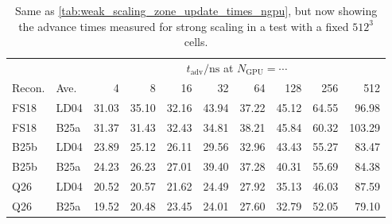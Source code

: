 \begin{table}
\centering
\caption{Same as \autoref{tab:weak_scaling_zone_update_times_ngpu}, but now showing the advance times measured for strong scaling in a test with a fixed $512^3$ cells.}
\label{tab:strong_scaling_zone_update_times_ngpu}
\begin{tabular}{llrrrrrrrr}
\hline\hline
& & \multicolumn{8}{c}{$t_\mathrm{adv}/\mathrm{ns}$ at $N_\mathrm{GPU}=\cdots$} \\
Recon. & Ave. &
4 & 8 & 16 & 32 & 64 & 128 & 256 & 512 \\
\hline
FS18 & LD04
& 31.03 & 35.10 & 32.16 & 43.94 & 37.22 & 45.12 & 64.55 & 96.98 \\
FS18 & B25a
& 31.37 & 31.43 & 32.43 & 34.81 & 38.21 & 45.84 & 60.32 & 103.29 \\

B25b & LD04
& 23.89 & 25.12 & 26.11 & 29.56 & 32.96 & 43.43 & 55.27 & 83.47 \\
B25b & B25a
& 24.23 & 26.23 & 27.01 & 39.40 & 37.28 & 40.31 & 55.69 & 84.38 \\

Q26 & LD04
& 20.52 & 20.57 & 21.62 & 24.49 & 27.92 & 35.13 & 46.03 & 87.59 \\
Q26 & B25a
& 19.52 & 20.48 & 23.45 & 24.01 & 27.60 & 32.79 & 52.05 & 79.10 \\
\hline\hline
\end{tabular}
\end{table}